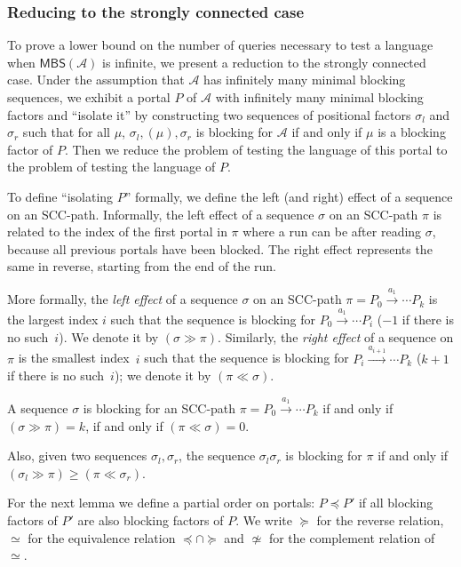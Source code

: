 \documentclass[letterpaper, USenglish, cleveref, autoref, thm-restate, numberwithinsect]{lipics-v2021}
\theoremstyle{theorem}
\theoremstyle{definition}
\newcommand{\Aa}{\mathcal{A}}
\newcommand{\equivportals}{\simeq}
\newcommand{\geqportals}{\succeq}
\newcommand{\lefteffect}[2]{(#1 \gg #2)}
\newcommand{\leqportals}{\preceq}
\newcommand{\MBS}{\textsf{MBS}\xspace}
\newcommand{\nequivportals}{\not\simeq}
\newcommand{\righteffect}[2]{(#2 \ll #1)}
\newcommand{\SCCpath}{\pi}
\begin{document}
\subsubsection{Reducing to the strongly connected case}

To prove a lower bound on the number of queries necessary to test a language when $\MBS(\Aa)$ is infinite, we present a reduction to the strongly connected case.
Under the assumption that $\Aa$ has infinitely many minimal blocking sequences, we exhibit a portal $P$ of $\Aa$ with infinitely many minimal blocking factors and ``isolate it'' by constructing two sequences of positional factors $\sigma_l$ and $\sigma_r$ such that for all $\mu$, $\sigma_l, (\mu), \sigma_r$ is blocking for $\Aa$ if and only if $\mu$ is a blocking factor of $P$.
Then we reduce the problem of testing the language of this portal to the problem of testing the language of $P$.

To define ``isolating $P$'' formally, we define the left (and right) effect of a sequence on an SCC-path.
Informally, the left effect of a sequence $\sigma$ on an SCC-path $\SCCpath$ is related to the index of the first portal in $\SCCpath$ where a run can be after reading $\sigma$, because all previous portals have been blocked. 
The right effect represents the same in reverse, starting from the end of the run.

More formally, the \emph{left effect} of a sequence $\sigma$ on an SCC-path $\SCCpath = P_0 \xrightarrow{a_1} \cdots P_k$ is the largest index $i$ such that the sequence is blocking for $P_0 \xrightarrow{a_1} \cdots P_i$ ($-1$ if there is no such~$i$). We denote it by $\lefteffect{\sigma}{\SCCpath}$.
Similarly, the \emph{right effect} of a sequence on $\pi$ is the smallest index~$i$ such that the sequence is blocking for $P_i \xrightarrow{a_{i+1}} \cdots P_k$  ($k+1$ if there is no such~$i$); we denote it by $\righteffect{\sigma}{\pi}$.

\begin{remark}
	A sequence $\sigma$ is blocking for an SCC-path $\SCCpath = P_0 \xrightarrow{a_1} \cdots  P_k$ if and only if $\lefteffect{\sigma}{\SCCpath} = k$, if and only if $\righteffect{\sigma}{\SCCpath} = 0$.
	
	Also, given two sequences $\sigma_l, \sigma_r$, the sequence $\sigma_l \sigma_r$ is blocking for $\SCCpath$ if and only if $\lefteffect{\sigma_l}{\SCCpath} \ge \righteffect{\sigma_r}{\SCCpath}$.
\end{remark}

For the next lemma we define a partial order on portals:
$P \leqportals P'$ if all blocking factors of $P'$ are also blocking factors of $P$.
We write $\geqportals$ for the reverse relation, $\equivportals$ for the equivalence relation $\leqportals \cap \geqportals$ and $\nequivportals$ for the complement relation of $\equivportals$.
\end{document}
